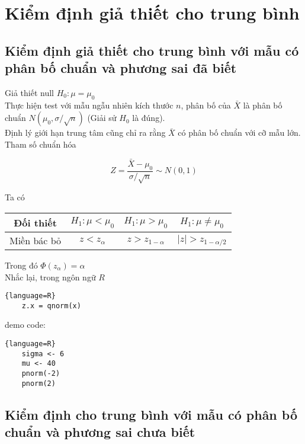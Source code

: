 \chapter{Kiểm định giả thiết cho trung bình}

\section{Kiểm định giả thiết cho trung bình với mẫu có phân bố chuẩn và phương sai đã biết}
Giả thiết null $H_0: \mu = \mu_0$ \\
Thực hiện test với mẫu ngẫu nhiên kích thước $n$, phân bố của $\bar{X}$ là phân bố chuẩn $N(\mu_0, \sigma / \sqrt{n})$
(Giải sử $H_0$ là đúng). \\
Định lý giới hạn trung tâm cũng chỉ ra rằng $\bar{X}$ có phân bố chuẩn với cỡ mẫu lớn. \\
Tham số chuẩn hóa 

\begin{equation}
    Z = \frac{\bar{X} - \mu_0}{\sigma / \sqrt{n}} \sim N(0, 1)
\end{equation}

Ta có

\begin{center}
    \begin{tabular}{| c | c | c | c |}
        \hline
        Đối thiết & $H_1: \mu < \mu_0$ & $H_1: \mu > \mu_0$ & $H_1: \mu \neq \mu_0$ \\
        \hline
        Miền bác bỏ & $z < z_{\alpha}$ & $z > z_{1-\alpha}$ & $\lvert z \rvert > z_{1 - \alpha / 2}$ \\
        \hline
    \end{tabular}
\end{center}

Trong đó $\Phi(z_\alpha) = \alpha$ \\
Nhắc lại, trong ngôn ngữ $R$
\begin{lstlisting}{language=R}
    z.x = qnorm(x)
\end{lstlisting}

demo code: 
\begin{lstlisting}{language=R}
    sigma <- 6
    mu <- 40
    pnorm(-2)
    pnorm(2)
\end{lstlisting}


\section{Kiểm định cho trung bình với mẫu có phân bố chuẩn và phương sai chưa biết}


